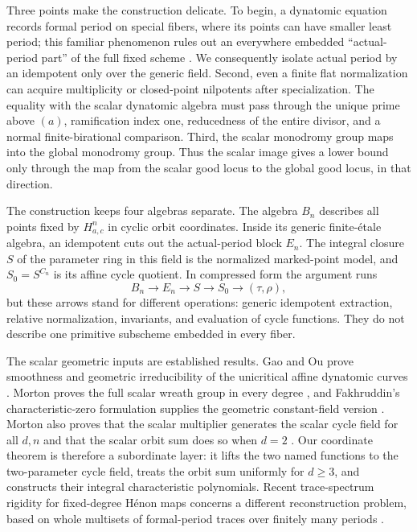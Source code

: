 \documentclass[11pt]{article}
\theoremstyle{definition}
\theoremstyle{remark}
\newcommand{\etale}{\'{e}tale}
\begin{document}
Three points make the construction delicate.  To begin, a dynatomic equation
records formal period on special fibers, where its points can have smaller
least period; this familiar phenomenon rules out an everywhere embedded
``actual-period part'' of the full fixed scheme
\citep{hutz-2010-dynatomic-cycles}.  We consequently isolate actual period by
an idempotent only over the generic field.  Second, even a finite flat
normalization can acquire multiplicity or closed-point nilpotents after
specialization.  The equality with the scalar dynatomic algebra must pass
through the unique prime above $(a)$, ramification index one, reducedness of
the entire divisor, and a normal finite-birational comparison.  Third, the
scalar monodromy group maps into the global monodromy group.  Thus the scalar
image gives a lower bound only through the map from the scalar good locus to
the global good locus, in that direction.

The construction keeps four algebras separate.  The algebra $B_n$ describes
all points fixed by $H_{a,c}^n$ in cyclic orbit coordinates.  Inside its
generic finite-\etale{} algebra, an idempotent cuts out the actual-period
block $E_n$.  The integral closure $S$ of the parameter ring in this field is
the normalized marked-point model, and $S_0=S^{C_n}$ is its affine cycle
quotient.  In compressed form the argument runs
\[
 B_n\longrightarrow E_n\longrightarrow S\longrightarrow S_0
 \longrightarrow (\tau,\rho),
\]
but these arrows stand for different operations: generic idempotent
extraction, relative normalization, invariants, and evaluation of cycle
functions.  They do not describe one primitive subscheme embedded in every
fiber.

The scalar geometric inputs are established results.  Gao and Ou prove
smoothness and geometric irreducibility of the unicritical affine dynatomic
curves \citep{gao-ou-2014-dynatomic}.  Morton proves the full scalar wreath
group in every degree \citep{morton-1998-periodic-galois}, and Fakhruddin's
characteristic-zero formulation supplies the geometric constant-field
version \citep{fakhruddin-2014-generic-endomorphisms}.  Morton also proves
that the scalar multiplier generates the scalar cycle field for all $d,n$
and that the scalar orbit sum does so when $d=2$
\citep{morton-1996-algebraic-curves}.  Our coordinate theorem is therefore a
subordinate layer: it lifts the two named functions to the two-parameter
cycle field, treats the orbit sum uniformly for $d\geq3$, and constructs
their integral characteristic polynomials.  Recent trace-spectrum rigidity
for fixed-degree H\'{e}non maps concerns a different reconstruction problem, based on
whole multisets of formal-period traces over finitely many periods
\citep{cantat-dujardin-2026-multiplier-rigidity}.
\end{document}
